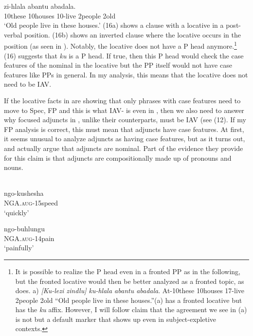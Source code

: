 \documentclass[output=paper,newtxmath,modfonts,nonflat,draft]{langsci/langscibook}
\begin{document}
\ex\label{ex:selvanathan:16b}
	  zi-hlala  abantu  abadala. \\
	10these   10houses   10-live   2people   2old\\
	\glt `Old people live in these houses.' 
\z
\z
(16a) shows a clause with a locative in a post-verbal position. (16b) shows an inverted clause where the locative occurs in the  position (as seen in ). Notably, the locative does not have a P head anymore.\footnote{It is possible to realize the P head even in a fronted PP as in the following, but the fronted locative would then be better analyzed as a fronted topic, as \citet{Buell2007} does. a)   \citep[108]{Buell2007}  \textit{[Ku-lezi  zindlu]    ku-hlala  abantu   abadala}.   At-10these   10houses   17-live     2people  2old  “Old people live in these houses.”(a) has a fronted locative but has the \textit{ku} affix. However, I will follow  claim that the agreement we see in (a) is not  but a default marker that shows up even in subject-expletive contexts.} (16) suggests that \textit{ku} is a P head. If true, then this P head would check the case features of the nominal in the locative but the PP itself would not have case features like PPs in general. In my analysis, this means that the locative does not need to be IAV. 

If the locative facts in  are showing that only phrases with case features need to move to Spec, FP and this is what IAV- is even in , then we also need to answer why focused adjuncts in , unlike their  counterparts, must be IAV (see (12). If my FP analysis is correct, this must mean that  adjuncts have case features. At first, it seems unusual to analyze adjuncts as having case features, but as it turns out, \citet{Halpert2012} and \citet{chengdowning2014} actually argue that  adjuncts are nominal. Part of the evidence they provide for this claim is that  adjuncts are compositionally made up of pronouns and nouns. 

\ea\label{ex:selvanathan:17}
\\
\ea\label{ex:selvanathan:17a}
\gll ngo-kushesha\\
NGA.\textsc{aug}{}-15speed\\
\glt `quickly'

\ex\label{ex:selvanathan:17b}
\gll ngo-buhlungu\\
NGA.\textsc{aug}{}-14pain\\
\glt `painfully'
\z
\z
\end{document}
